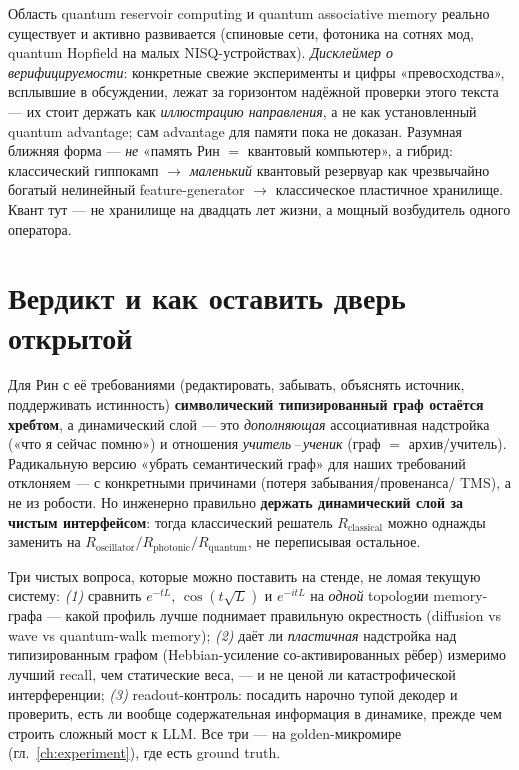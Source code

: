 \begin{openq}
Область quantum reservoir computing и quantum associative memory реально существует и активно
развивается (спиновые сети, фотоника на сотнях мод, quantum Hopfield на малых NISQ-устройствах).
\emph{Дисклеймер о верифицируемости}: конкретные свежие эксперименты и цифры «превосходства»,
всплывшие в обсуждении, лежат за горизонтом надёжной проверки этого текста — их стоит держать
как \emph{иллюстрацию направления}, а не как установленный quantum advantage; сам advantage для
памяти пока не доказан. Разумная ближняя форма — \emph{не} «память Рин $=$ квантовый компьютер»,
а гибрид: классический гиппокамп $\to$ \emph{маленький} квантовый резервуар как чрезвычайно
богатый нелинейный feature-generator $\to$ классическое пластичное хранилище. Квант тут — не
хранилище на двадцать лет жизни, а мощный возбудитель одного оператора.
\end{openq}

\section{Вердикт и как оставить дверь открытой}

Для Рин с её требованиями (редактировать, забывать, объяснять источник, поддерживать
истинность) \textbf{символический типизированный граф остаётся хребтом}, а динамический слой —
это \emph{дополняющая} ассоциативная надстройка («что я сейчас помню») и отношения
\emph{учитель\,--\,ученик} (граф $=$ архив/учитель). Радикальную версию «убрать семантический
граф» для наших требований отклоняем — с конкретными причинами (потеря забывания/провенанса/
TMS), а не из робости. Но инженерно правильно \textbf{держать динамический слой за чистым
интерфейсом}: тогда классический решатель $R_{\text{classical}}$ можно однажды заменить на
$R_{\text{oscillator}}/R_{\text{photonic}}/R_{\text{quantum}}$, не переписывая остальное.

\begin{openq}
Три чистых вопроса, которые можно поставить на стенде, не ломая текущую систему:
\emph{(1)} сравнить $e^{-tL}$, $\cos(t\sqrt L)$ и $e^{-itL}$ на \emph{одной} topologии
memory-графа — какой профиль лучше поднимает правильную окрестность (diffusion vs wave vs
quantum-walk memory); \emph{(2)} даёт ли \emph{пластичная} надстройка над типизированным графом
(Hebbian-усиление со-активированных рёбер) измеримо лучший recall, чем статические веса, — и не
ценой ли катастрофической интерференции; \emph{(3)} readout-контроль: посадить нарочно тупой
декодер и проверить, есть ли вообще содержательная информация в динамике, прежде чем строить
сложный мост к LLM. Все три — на golden-микромире (гл.~\ref{ch:experiment}), где есть ground
truth.
\end{openq}
